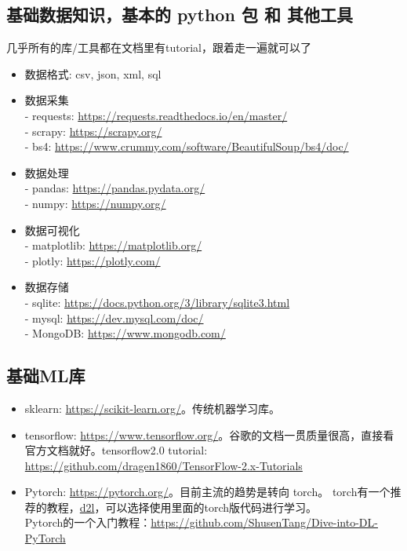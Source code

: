 \documentclass[lang=cn,11pt,a4paper]{elegant_template}
\begin{document}
\subsection{基础数据知识，基本的 python 包 和 其他工具}
几乎所有的库/工具都在文档里有tutorial，跟着走一遍就可以了
\begin{itemize}
    \item 数据格式: csv, json, xml, sql
    \item 数据采集\\
    - requests: \href{https://requests.readthedocs.io/en/master/}{https://requests.readthedocs.io/en/master/} \\
    - scrapy:  \href{https://scrapy.org/}{https://scrapy.org/} \\
    - bs4: \href{https://www.crummy.com/software/BeautifulSoup/bs4/doc/}{https://www.crummy.com/software/BeautifulSoup/bs4/doc/} 
    \item 数据处理 \\
    - pandas: \href{https://pandas.pydata.org/}{https://pandas.pydata.org/} \\
    - numpy:  \href{https://numpy.org/}{https://numpy.org/}
    \item 数据可视化\\
    - matplotlib: \href{https://matplotlib.org/}{https://matplotlib.org/} \\
    - plotly: \href{https://plotly.com/}{https://plotly.com/}
    \item 数据存储 \\
    - sqlite: \href{https://docs.python.org/3/library/sqlite3.html}{https://docs.python.org/3/library/sqlite3.html} \\
    - mysql: \href{https://dev.mysql.com/doc/}{https://dev.mysql.com/doc/} \\
    - MongoDB: \href{https://www.mongodb.com/}{https://www.mongodb.com/}
\end{itemize}
 
\subsection{基础ML库}
\begin{itemize}
    \item sklearn: \href{https://scikit-learn.org/}{https://scikit-learn.org/}。传统机器学习库。
    \item tensorflow: \href{https://www.tensorflow.org/}{https://www.tensorflow.org/}。谷歌的文档一贯质量很高，直接看官方文档就好。tensorflow2.0 tutorial: \href{https://github.com/dragen1860/TensorFlow-2.x-Tutorials}{https://github.com/dragen1860/TensorFlow-2.x-Tutorials}
    \item Pytorch: \href{https://pytorch.org/}{https://pytorch.org/}。目前主流的趋势是转向 torch。 torch有一个推荐的教程，\href{https://d2l.ai/}{d2l}，可以选择使用里面的torch版代码进行学习。\\
    Pytorch的一个入门教程：\href{https://github.com/ShusenTang/Dive-into-DL-PyTorch}{https://github.com/ShusenTang/Dive-into-DL-PyTorch}
\end{itemize}
\end{document}
